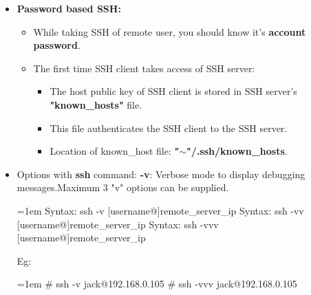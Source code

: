 \begin{flushleft}
\begin{itemize}
	
	\newpage
	\item \textbf{Password based SSH:}
	\bigskip
	\begin{itemize}
		\item While taking SSH of remote user, you should know it's \textbf{account password}.
		\item The first time SSH client takes access of SSH server:
		\begin{itemize}
			\item The host public key of SSH client is stored in SSH server's \textbf{"known\_hosts"} file.
			\item This file authenticates the SSH client to the SSH server.
			\item Location of known\_host file: \textbf{{"$\sim$"}/.ssh/known\_hosts}.
		\end{itemize}
	\end{itemize}
	\bigskip\bigskip
	\item Options with \textbf{ssh} command:
	\newline
	\textbf{-v}: Verbose mode to display debugging messages.Maximum 3 "v" options can be supplied.
	\begin{tcolorbox}[breakable,notitle,boxrule=0pt,colback=pink,colframe=pink]
		\color{black}
		\font=1em
		Syntax: ssh -v [username@]remote\_server\_ip
		\newline
		Syntax: ssh -vv [username@]remote\_server\_ip
		\newline
		Syntax: ssh -vvv [username@]remote\_server\_ip
		\font=4pt
	\end{tcolorbox}
	
	Eg:
	\begin{tcolorbox}[breakable,notitle,boxrule=-0pt,colback=black,colframe=black]
		\color{green}
		\font=1em
		\# ssh -v jack@192.168.0.105
		\newline
		\# ssh -vvv jack@192.168.0.105
		\font=4pt
	\end{tcolorbox}
	
	
	
	
	
	
\end{itemize}





\end{flushleft}
\newpage


